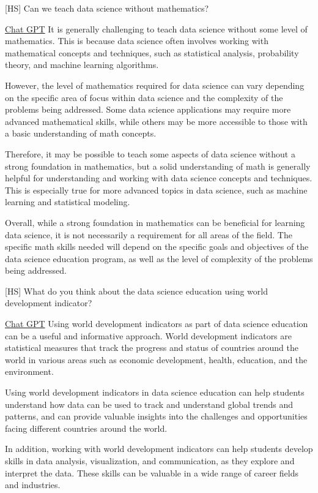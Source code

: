 \documentclass[
]{bxjsbook}
\theoremstyle{definition}
\theoremstyle{definition}
\theoremstyle{definition}
\theoremstyle{definition}
\theoremstyle{remark}
\begin{document}
{[}HS{]} Can we teach data science without mathematics?

\protect\hyperlink{chatgpt}{Chat GPT} It is generally challenging to teach data science without some level of mathematics. This is because data science often involves working with mathematical concepts and techniques, such as statistical analysis, probability theory, and machine learning algorithms.

However, the level of mathematics required for data science can vary depending on the specific area of focus within data science and the complexity of the problems being addressed. Some data science applications may require more advanced mathematical skills, while others may be more accessible to those with a basic understanding of math concepts.

Therefore, it may be possible to teach some aspects of data science without a strong foundation in mathematics, but a solid understanding of math is generally helpful for understanding and working with data science concepts and techniques. This is especially true for more advanced topics in data science, such as machine learning and statistical modeling.

Overall, while a strong foundation in mathematics can be beneficial for learning data science, it is not necessarily a requirement for all areas of the field. The specific math skills needed will depend on the specific goals and objectives of the data science education program, as well as the level of complexity of the problems being addressed.

{[}HS{]} What do you think about the data science education using world development indicator?

\protect\hyperlink{chatgpt}{Chat GPT} Using world development indicators as part of data science education can be a useful and informative approach. World development indicators are statistical measures that track the progress and status of countries around the world in various areas such as economic development, health, education, and the environment.

Using world development indicators in data science education can help students understand how data can be used to track and understand global trends and patterns, and can provide valuable insights into the challenges and opportunities facing different countries around the world.

In addition, working with world development indicators can help students develop skills in data analysis, visualization, and communication, as they explore and interpret the data. These skills can be valuable in a wide range of career fields and industries.
\end{document}
